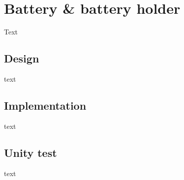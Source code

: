 \section{Battery \& battery holder}
Text

\subsection{Design}
text

\subsection{Implementation}
text

\subsection{Unity test}
text
